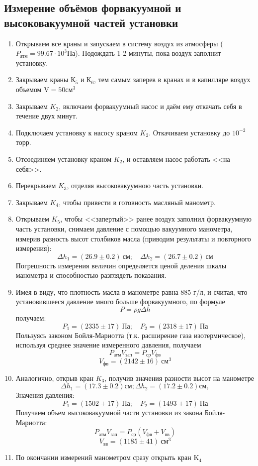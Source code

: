 \documentclass[12pt,a4paper]{article}
\begin{document}
\subsection*{Измерение объёмов форвакуумной и высоковакуумной частей установки}
\begin{enumerate}
		\item  Открываем все краны и запускаем в систему воздух из атмосферы ($P_\text{атм}=99.67 \cdot 10^3 \text{Па}$). Подождать 1-2 минуты, пока воздух заполнит установку.
        \item Закрываем краны $\text{К}_5$ и $\text{К}_6$, тем самым заперев в кранах и в капилляре воздух объемом $\text{V}=50 \text{см}^3$
		\item Закрываем $K_2$, включаем форвакуумный насос и даём ему откачать себя в течение двух минут.
        \item Подключаем установку к насосу краном $K_2$. Откачиваем установку до $10^{-2}$ торр. 
        \item Отсоединяем установку краном $K_2$, и оставляем насос работать <<на себя>>. 
        \item Перекрываем  $K_3$, отделяя высоковакуумною часть установки. 
        \item Закрываем  $K_4$, чтобы привести в готовность масляный манометр.
		\item Открываем  $K_5$, чтобы <<запертый>> ранее воздух заполнил форвакуумную часть установки, снимаем давление с помощью вакуумного манометра, измерив разность высот столбиков масла (приводим результаты и повторного измерения):
		$$
		\Delta h_1 = (26.9\pm0.2) ~\text{см};\quad \Delta h_2 = (26.7\pm0.2) ~\text{см}
		$$
		Погрешность измерения величин определяется ценой деления шкалы манометра и способностью разглядеть показания.
		\item Имея в виду, что плотность масла в манометре равна 885 г/л, и считая, что установившееся давление много больше форвакуумного, по формуле $$P=\rho g\Delta h$$ получаем:
		$$
		P_1 = (2335\pm17)~\text{Па};\quad P_2 = (2318\pm17)~\text{Па}
		$$
		Пользуясь законом Бойля-Мариотта (т.к. расширение газа изотермическое), используя среднее значение измеренного давления, получаем
        \begin{equation*}
        P_\text{атм}V_\text{зап}=P_\text{ср}V_\text{фв}
        \end{equation*}
		$$
		V_\text{фв} = (2142\pm16)~\text{см}^3
		$$
		\item Аналогично, открыв кран $K_3$, получив значения разности высот на манометре
		$$
		\Delta h_1 = (17.3\pm0.2) \text{см}; \Delta h_2 = (17.2\pm0.2) \text{см},
		$$
        Значения давления:
        $$
		P_1 = (1502\pm17)~\text{Па};\quad P_2 = (1493\pm17)~\text{Па}
		$$
		Получаем объем высоковакуумной части установки из закона Бойля-Мариотта:
        \begin{equation*}
        P_\text{атм}V_\text{зап}=P_\text{ср}(V_\text{фв}+V_\text{вв})
        \end{equation*}
		$$
		V_\text{вв} = (1185\pm41)~\text{см}^3
		$$
    \item По окончании измерений манометром сразу открыть кран $\text{K}_4$
	\end{enumerate}
\end{document}
